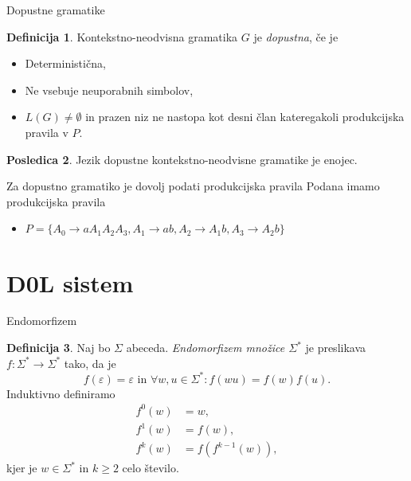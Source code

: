 \documentclass{beamer}
\theoremstyle{definition}
\newtheorem{definicija}{Definicija}[section]
\newtheorem{posledica}[definicija]{Posledica}
\begin{document}
\begin{frame}{Dopustne gramatike}
    \begin{definicija}
        Kontekstno-neodvisna gramatika $G$ je \textit{dopustna}, če je
        \begin{itemize}
            \item Deterministična,
            \item Ne vsebuje neuporabnih simbolov,
            \item  $ L(G) \neq \emptyset $ in prazen niz ne nastopa kot desni član kateregakoli produkcijska pravila v $ P $.
        \end{itemize}
    \end{definicija}
    \pause
    \begin{posledica}
        Jezik dopustne kontekstno-neodvisne gramatike je enojec.
    \end{posledica}
\end{frame}

\begin{frame}
    \begin{exampleblock}{Za dopustno gramatiko je dovolj podati produkcijska pravila}
        Podana imamo produkcijska pravila 
        \begin{itemize}
            \item $ P = \{ A_0 \rightarrow aA_1A_2A_3, A_1 \rightarrow ab, A_2 \rightarrow A_1b, A_3 \rightarrow A_2b \} $ 
        \end{itemize}
        \pause
        \pause
        \pause
    \end{exampleblock}
\end{frame}

\section{D0L sistem}

\begin{frame}{Endomorfizem}
    \begin{definicija}
        Naj bo $ \Sigma $ abeceda. \textit{Endomorfizem množice $ \Sigma^* $} je preslikava $ f \colon \Sigma^* \to \Sigma^* $
        tako, da je
        \[
            f(\varepsilon) = \varepsilon \text{ in } \forall w,u \in \Sigma^* \colon f(wu) = f(w)f(u).
        \]
        \pause
        Induktivno definiramo
        \begin{align*}
            f^0(w) &= w, \\
            f^1(w) &= f(w), \\
            f^k(w) &= f(f^{k-1}(w)),
        \end{align*}
        kjer je $ w \in \Sigma^* $ in $ k \geq 2 $ celo število.
    \end{definicija}
\end{frame}
\end{document}
